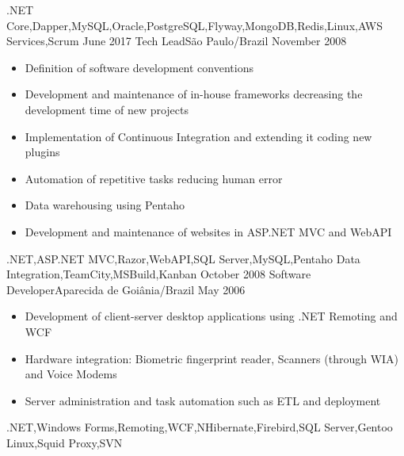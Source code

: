 \begin{experiences}
{\begin{itemize}
                  \end{itemize}
                }
                {.NET Core,Dapper,MySQL,Oracle,PostgreSQL,Flyway,MongoDB,Redis,Linux,AWS Services,Scrum}
  \emptySeparator
  \experience
    {June 2017}     {Tech Lead}{}{São Paulo/Brazil}
    {November 2008} {
                      \begin{itemize}
                        \item Definition of software development conventions
                        \item Development and maintenance of in-house frameworks decreasing the development time of new projects
                        \item Implementation of Continuous Integration and extending it coding new plugins
                        \item Automation of repetitive tasks reducing human error
                        \item Data warehousing using Pentaho
                        \item Development and maintenance of websites in ASP.NET MVC and WebAPI
                      \end{itemize}
                    }
                    {.NET,ASP.NET MVC,Razor,WebAPI,SQL Server,MySQL,Pentaho Data Integration,TeamCity,MSBuild,Kanban}
  \emptySeparator
  \experience
  {October 2008} {Software Developer}{}{Aparecida de Goiânia/Brazil}
  {May 2006}     {
                   \begin{itemize}
                     \item Development of client-server desktop applications using .NET Remoting and WCF
                     \item Hardware integration: Biometric fingerprint reader, Scanners (through WIA) and Voice Modems
                     \item Server administration and task automation such as ETL and deployment
                   \end{itemize}
                 }
                 {.NET,Windows Forms,Remoting,WCF,NHibernate,Firebird,SQL Server,Gentoo Linux,Squid Proxy,SVN}
\end{experiences}